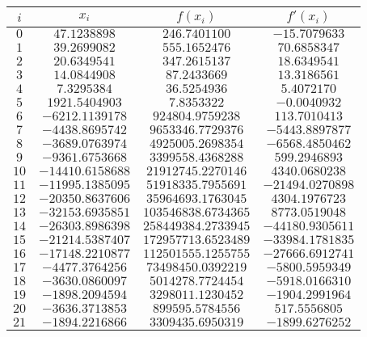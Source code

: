 \begin{center}
	\begin{longtable}{|c|c|c|c|} \hline
		$i$ & $x_{i}$ & $f(x_{i})$ & $f'(x_{i})$ \\ \hline
		$0$ & $47.1238898$ & $246.7401100$ & $-15.7079633$ \\ \hline
		$1$ & $39.2699082$ & $555.1652476$ & $70.6858347$ \\ \hline
		$2$ & $20.6349541$ & $347.2615137$ & $18.6349541$ \\ \hline
		$3$ & $14.0844908$ & $87.2433669$ & $13.3186561$ \\ \hline
		$4$ & $7.3295384$ & $36.5254936$ & $5.4072170$ \\ \hline
		$5$ & $1921.5404903$ & $7.8353322$ & $-0.0040932$ \\ \hline
		$6$ & $-6212.1139178$ & $924804.9759238$ & $113.7010413$ \\ \hline
		$7$ & $-4438.8695742$ & $9653346.7729376$ & $-5443.8897877$ \\ \hline
		$8$ & $-3689.0763974$ & $4925005.2698354$ & $-6568.4850462$ \\ \hline
		$9$ & $-9361.6753668$ & $3399558.4368288$ & $599.2946893$ \\ \hline
		$10$ & $-14410.6158688$ & $21912745.2270146$ & $4340.0680238$ \\ \hline
		$11$ & $-11995.1385095$ & $51918335.7955691$ & $-21494.0270898$ \\ \hline
		$12$ & $-20350.8637606$ & $35964693.1763045$ & $4304.1976723$ \\ \hline
		$13$ & $-32153.6935851$ & $103546838.6734365$ & $8773.0519048$ \\ \hline
		$14$ & $-26303.8986398$ & $258449384.2733945$ & $-44180.9305611$ \\ \hline
		$15$ & $-21214.5387407$ & $172957713.6523489$ & $-33984.1781835$ \\ \hline
		$16$ & $-17148.2210877$ & $112501555.1255755$ & $-27666.6912741$ \\ \hline
		$17$ & $-4477.3764256$ & $73498450.0392219$ & $-5800.5959349$ \\ \hline
		$18$ & $-3630.0860097$ & $5014278.7724454$ & $-5918.0166310$ \\ \hline
		$19$ & $-1898.2094594$ & $3298011.1230452$ & $-1904.2991964$ \\ \hline
		$20$ & $-3636.3713853$ & $899595.5784556$ & $517.5556805$ \\ \hline
		$21$ & $-1894.2216866$ & $3309435.6950319$ & $-1899.6276252$ \\ \hline

\end{longtable}
\end{center}
